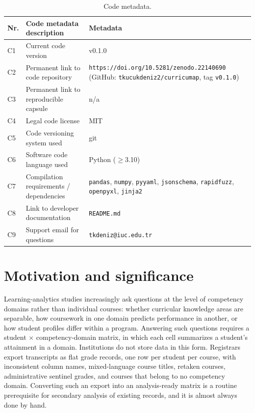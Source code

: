 \documentclass[11pt]{article}
\begin{document}
\begin{table}[h]
\centering
\footnotesize
\renewcommand{\arraystretch}{0.92}
\begin{tabular}{@{}p{0.6cm}p{6.2cm}p{7.2cm}@{}}
\toprule
Nr. & Code metadata description & Metadata \\
\midrule
C1 & Current code version & v0.1.0 \\
C2 & Permanent link to code repository & \texttt{https://doi.org/10.5281/zenodo.22140690} \newline (GitHub: \texttt{tkucukdeniz2/curricumap}, tag \texttt{v0.1.0}) \\
C3 & Permanent link to reproducible capsule & n/a \\
C4 & Legal code license & MIT \\
C5 & Code versioning system used & git \\
C6 & Software code language used & Python ($\geq$3.10) \\
C7 & Compilation requirements / dependencies & \texttt{pandas}, \texttt{numpy}, \texttt{pyyaml}, \texttt{jsonschema}, \texttt{rapidfuzz}, \texttt{openpyxl}, \texttt{jinja2} \\
C8 & Link to developer documentation & \texttt{README.md} \\
C9 & Support email for questions & \texttt{tkdeniz@iuc.edu.tr} \\
\bottomrule
\end{tabular}
\caption{Code metadata.}
\end{table}

\section{Motivation and significance}

Learning-analytics studies increasingly ask questions at the level of competency domains rather than individual courses: whether curricular knowledge areas are separable, how coursework in one domain predicts performance in another, or how student profiles differ within a program. Answering such questions requires a student $\times$ competency-domain matrix, in which each cell summarizes a student's attainment in a domain. Institutions do not store data in this form. Registrars export transcripts as flat grade records, one row per student per course, with inconsistent column names, mixed-language course titles, retaken courses, administrative sentinel grades, and courses that belong to no competency domain. Converting such an export into an analysis-ready matrix is a routine prerequisite for secondary analysis of existing records, and it is almost always done by hand.
\end{document}
